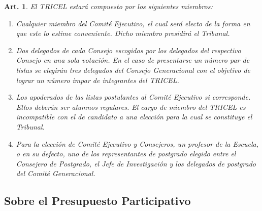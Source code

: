 \documentclass[letterpaper,11pt]{article}
\theoremstyle{plain}
\newtheorem{art}{Art.} %
\begin{document}
			\begin{art}\label{composicionTRICEL}
				El TRICEL estará compuesto por los siguientes miembros:
				\begin{enumerate}
					\item Cualquier miembro del Comité Ejecutivo, el cual será electo de la forma en que este lo estime conveniente. Dicho miembro presidirá el Tribunal.
					\item Dos delegados de cada  Consejo escogidos por los delegados del respectivo Consejo en una sola votación. En el caso de presentarse un número par de listas se elegirán tres delegados del Consejo Generacional con el objetivo de lograr un número impar de integrantes del TRICEL.
					\item Los apoderados de las listas postulantes al Comité Ejecutivo si corresponde. Ellos deberán ser alumnos regulares. El cargo de miembro del TRICEL es incompatible con el de candidato a una elección para la cual se constituye el Tribunal.
					\item Para la elección de Comité Ejecutivo y Consejeros, un profesor de la Escuela, o en su defecto, uno de los representantes de postgrado elegido entre el Consejero de Postgrado, el Jefe de Investigación y los delegados de postgrado del Comité Generacional.
				\end{enumerate}
			\end{art}

		\subsection*{Sobre el Presupuesto Participativo}
\end{document}
